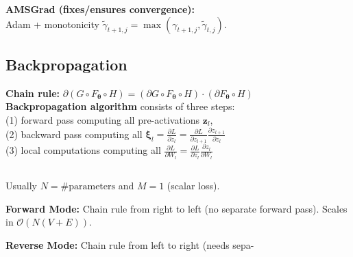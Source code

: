 \textbf{AMSGrad (fixes/ensures convergence):}\\
Adam + monotonicity $\tilde \gamma_{t+1, j} = \max(\gamma_{t+1, j}, \tilde \gamma_{t, j})$.

\subsection*{Backpropagation}
\textbf{Chain rule:} $\partial (G\circ F_{\pmb\theta} \circ H) = (\partial G \circ F_{\pmb\theta}\circ H)\cdot (\partial F_{\pmb\theta}\circ H)$\\
\textbf{Backpropagation algorithm} consists of three steps:\\
(1) forward pass computing all pre-activations $\mathbf z_l$, \\
(2) backward pass computing all $\pmb\xi_{l} = \frac{\partial L}{\partial z_l} = \frac{\partial L}{\partial z_{l+1}} \frac{\partial z_{l+1}}{\partial z_{l}}$\\
(3) local computations computing all $\frac{\partial L}{\partial W_l} = \frac{\partial L}{\partial z_l} \frac{\partial z_l}{\partial W_l}$
\subsection*{}
Usually $N=\#\text{parameters}$ and $M=1$ (scalar loss).

\textbf{Forward Mode:} Chain rule from right to left (no separate forward pass). Scales in $\mathcal O(N(V+E))$.

\textbf{Reverse Mode:} Chain rule from left to right (needs sepa- 


\color{red}